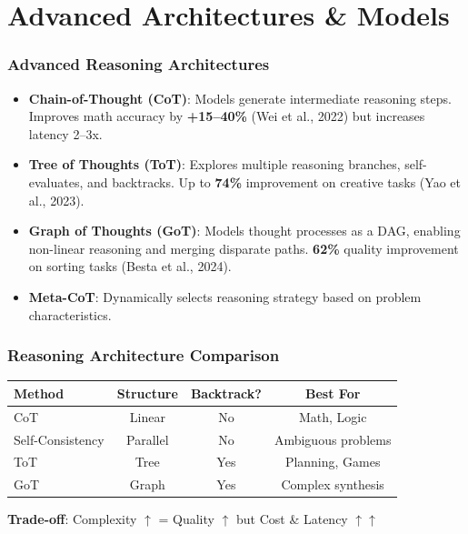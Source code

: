\documentclass{beamer}
\begin{document}
\section{Advanced Architectures \& Models}

\begin{frame}
    \frametitle{Advanced Reasoning Architectures}
    \begin{itemize}
        \item \textbf{Chain-of-Thought (CoT)}: Models generate intermediate reasoning steps. Improves math accuracy by \textbf{+15--40\%} (Wei et al., 2022) but increases latency 2--3x.
        \item \textbf{Tree of Thoughts (ToT)}: Explores multiple reasoning branches, self-evaluates, and backtracks. Up to \textbf{74\%} improvement on creative tasks (Yao et al., 2023).
        \item \textbf{Graph of Thoughts (GoT)}: Models thought processes as a DAG, enabling non-linear reasoning and merging disparate paths. \textbf{62\%} quality improvement on sorting tasks (Besta et al., 2024).
        \item \textbf{Meta-CoT}: Dynamically selects reasoning strategy based on problem characteristics.
    \end{itemize}
\end{frame}

\begin{frame}
    \frametitle{Reasoning Architecture Comparison}
    \begin{center}
    \begin{tabular}{lccc}
    \toprule
    \textbf{Method} & \textbf{Structure} & \textbf{Backtrack?} & \textbf{Best For} \\
    \midrule
    CoT & Linear & No & Math, Logic \\
    Self-Consistency & Parallel & No & Ambiguous problems \\
    ToT & Tree & Yes & Planning, Games \\
    GoT & Graph & Yes & Complex synthesis \\
    \bottomrule
    \end{tabular}
    \end{center}
    \vspace{0.3cm}
    \textbf{Trade-off}: Complexity $\uparrow$ = Quality $\uparrow$ but Cost \& Latency $\uparrow\uparrow$
\end{frame}
\end{document}
